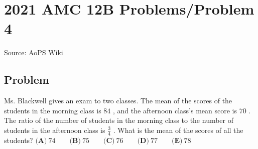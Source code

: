 \documentclass[12pt]{article}
\begin{document}
\section*{{2021 AMC 12B Problems/Problem 4}}
Source: AoPS Wiki

\subsection*{Problem}
Ms. Blackwell gives an exam to two classes. The mean of the scores of the students in the morning class is $84$ , and the afternoon class's mean score is $70$ . The ratio of the number of students in the morning class to the number of students in the afternoon class is $\frac{3}{4}$ . What is the mean of the scores of all the students? $\textbf{(A)} ~74 \qquad\textbf{(B)} ~75 \qquad\textbf{(C)} ~76 \qquad\textbf{(D)} ~77 \qquad\textbf{(E)} ~78$
\end{document}
